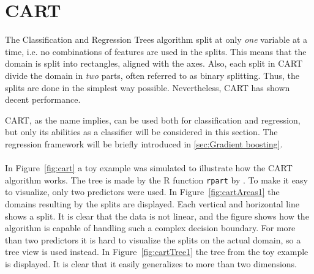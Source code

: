 \section{CART}
\label{sec:CART}
%
The Classification and Regression Trees algorithm split at only \textit{one} variable at a time, i.e. no combinations of features are used in the splits. This means that the domain is split into rectangles, aligned with the axes. 
Also, each split in CART divide the domain in \textit{two} parts, often referred to as binary splitting. Thus, the splits are done in the simplest way possible. Nevertheless, CART has shown decent performance. 

CART, as the name implies, can be used both for classification and regression, but only its abilities as a classifier will be considered in this section. The regression framework will be briefly introduced in \ref{sec:Gradient boosting}.
\\
\\
In Figure~\ref{fig:cart} a toy example was simulated to illustrate how the CART algorithm works. The tree is made by the R function \verb+rpart+ by \cite{rpart}. To make it easy to visualize, only two predictors were used. 
In Figure~\ref{fig:cartAreas1} the domains resulting by the splits are displayed. Each vertical and horizontal line shows a split. It is clear that the data is not linear, and the figure shows how the algorithm is capable of handling such a complex decision boundary.
For more than two predictors it is hard to visualize the splits on the actual domain, so a tree view is used instead.
 In Figure~\ref{fig:cartTree1} the tree from the toy example is displayed. It is clear that it easily generalizes to more than two dimensions. \\
%
